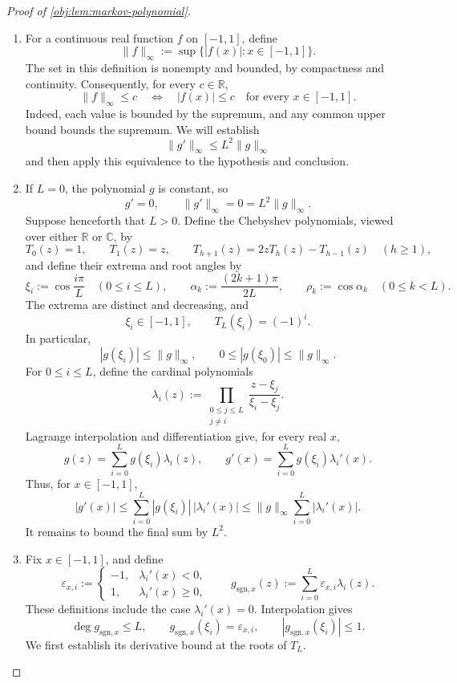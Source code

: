 \documentclass[11pt]{article}
\begin{document}
\begin{proof}[Proof of \cref{obj:lem:markov-polynomial}]
\begin{enumerate}
\item For a continuous real function \(f\) on \([-1,1]\), define
\[
\|f\|_{\infty}
  :=\sup\{|f(x)|:x\in[-1,1]\}.
\]
The set in this definition is nonempty and bounded, by compactness and continuity. Consequently, for every \(c\in\mathbb R\),
\[
\|f\|_{\infty}\le c
\quad\Longleftrightarrow\quad
|f(x)|\le c\quad\text{for every }x\in[-1,1].
\]
Indeed, each value is bounded by the supremum, and any common upper bound bounds the supremum. We will establish
\[
\|g'\|_{\infty}\le L^2\|g\|_{\infty}
\]
and then apply this equivalence to the hypothesis and conclusion.

\item If \(L=0\), the polynomial \(g\) is constant, so
\[
g'=0,\qquad \|g'\|_{\infty}=0=L^2\|g\|_{\infty}.
\]
Suppose henceforth that \(L>0\). Define the Chebyshev polynomials, viewed over either \(\mathbb R\) or \(\mathbb C\), by
\[
T_0(z)=1,\qquad T_1(z)=z,\qquad
T_{h+1}(z)=2zT_h(z)-T_{h-1}(z)\quad(h\ge1),
\]
and define their extrema and root angles by
\[
\xi_i:=\cos\frac{i\pi}{L}\quad(0\le i\le L),\qquad
\alpha_k:=\frac{(2k+1)\pi}{2L},\qquad
\rho_k:=\cos\alpha_k\quad(0\le k<L).
\]
The extrema are distinct and decreasing, and
\[
\xi_i\in[-1,1],\qquad
T_L(\xi_i)=(-1)^i.
\]
In particular,
\[
|g(\xi_i)|\le\|g\|_{\infty},
\qquad
0\le |g(\xi_0)|\le\|g\|_{\infty}.
\]
For \(0\le i\le L\), define the cardinal polynomials
\[
\lambda_i(z):=
\prod_{\substack{0\le j\le L\\j\ne i}}
\frac{z-\xi_j}{\xi_i-\xi_j}.
\]
Lagrange interpolation and differentiation give, for every real \(x\),
\[
g(z)=\sum_{i=0}^{L}g(\xi_i)\lambda_i(z),
\qquad
g'(x)=\sum_{i=0}^{L}g(\xi_i)\lambda_i'(x).
\]
Thus, for \(x\in[-1,1]\),
\[
|g'(x)|
\le\sum_{i=0}^{L}|g(\xi_i)|\,|\lambda_i'(x)|
\le\|g\|_{\infty}\sum_{i=0}^{L}|\lambda_i'(x)|.
\]
It remains to bound the final sum by \(L^2\).

\item Fix \(x\in[-1,1]\), and define
\[
\varepsilon_{x,i}:=
\begin{cases}
-1,&\lambda_i'(x)<0,\\
1,&\lambda_i'(x)\ge0,
\end{cases}
\qquad
g_{\mathrm{sgn},x}(z):=\sum_{i=0}^{L}\varepsilon_{x,i}\lambda_i(z).
\]
These definitions include the case \(\lambda_i'(x)=0\). Interpolation gives
\[
\deg g_{\mathrm{sgn},x}\le L,\qquad
g_{\mathrm{sgn},x}(\xi_i)=\varepsilon_{x,i},
\qquad
|g_{\mathrm{sgn},x}(\xi_i)|\le1.
\]
We first establish its derivative bound at the roots of \(T_L\).


\end{enumerate}
\end{proof}
\end{document}
